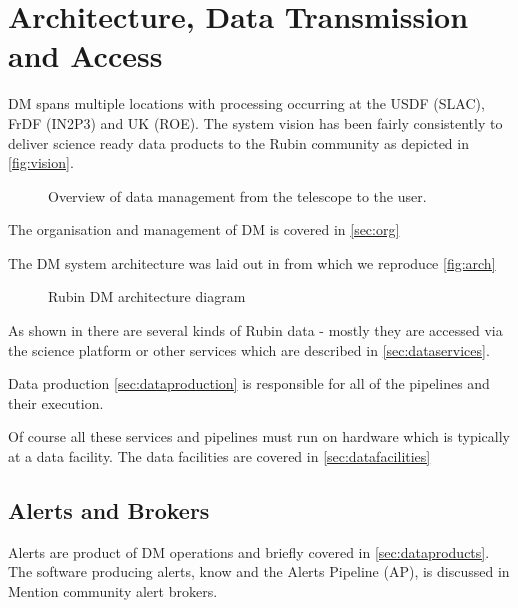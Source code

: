 \section {Architecture, Data Transmission and  Access } \label{sec:arch}
DM spans multiple locations with processing occurring at the USDF (SLAC), FrDF (IN2P3) and UK (ROE).
The system vision has been fairly consistently to deliver science ready data products to the Rubin community as depicted in \autoref{fig:vision}.

\begin{figure*}[ht]
\caption{Overview of data management from the telescope to the user. \label{fig:vision}}
\end{figure*}

The organisation and management of DM is covered in \autoref{sec:org}

The DM system architecture was laid out in \cite{LDM-148} from which we reproduce \autoref{fig:arch}
\begin{figure}
\caption{Rubin DM architecture diagram \citet{LDM-148}\label{fig:arch}}
\end{figure}


As shown in  there are several kinds of Rubin data - mostly they are accessed via
the science platform or other services which are described in \autoref{sec:dataservices}.

Data production \autoref{sec:dataproduction} is responsible for all of the pipelines and their execution.

Of course all these services and pipelines must run on hardware which is typically at a data facility.
The data facilities are covered in \autoref{sec:datafacilities}


\subsection{Alerts and Brokers}
Alerts are  product of DM operations and  briefly covered in \autoref{sec:dataproducts}.
The software producing alerts, know and the Alerts Pipeline (AP), is discussed in 
Mention community alert brokers.
